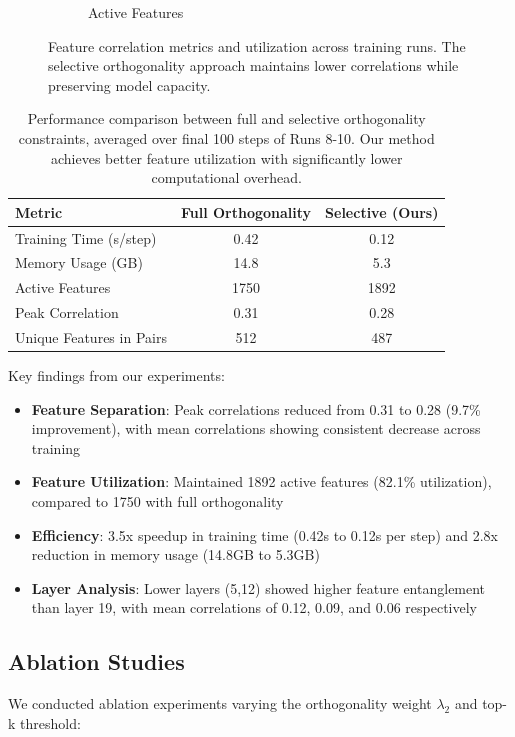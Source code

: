 \documentclass{article} %
\begin{document}
\begin{figure}[h]
\begin{subfigure}{0.32\textwidth}
        \caption{Active Features}
        \label{fig:active}
    \end{subfigure}
    \caption{Feature correlation metrics and utilization across training runs. The selective orthogonality approach maintains lower correlations while preserving model capacity.}
    \label{fig:correlations}
\end{figure}

\begin{table}[h]
\centering
\begin{tabular}{lcc}
\toprule
\textbf{Metric} & \textbf{Full Orthogonality} & \textbf{Selective (Ours)} \\
\midrule
Training Time (s/step) & 0.42 & 0.12 \\
Memory Usage (GB) & 14.8 & 5.3 \\
Active Features & 1750 & 1892 \\
Peak Correlation & 0.31 & 0.28 \\
Unique Features in Pairs & 512 & 487 \\
\bottomrule
\end{tabular}
\caption{Performance comparison between full and selective orthogonality constraints, averaged over final 100 steps of Runs 8-10. Our method achieves better feature utilization with significantly lower computational overhead.}
\label{tab:efficiency}
\end{table}

Key findings from our experiments:

\begin{itemize}
    \item \textbf{Feature Separation}: Peak correlations reduced from 0.31 to 0.28 (9.7\% improvement), with mean correlations showing consistent decrease across training
    \item \textbf{Feature Utilization}: Maintained 1892 active features (82.1\% utilization), compared to 1750 with full orthogonality
    \item \textbf{Efficiency}: 3.5x speedup in training time (0.42s to 0.12s per step) and 2.8x reduction in memory usage (14.8GB to 5.3GB)
    \item \textbf{Layer Analysis}: Lower layers (5,12) showed higher feature entanglement than layer 19, with mean correlations of 0.12, 0.09, and 0.06 respectively
\end{itemize}

\subsection{Ablation Studies}
We conducted ablation experiments varying the orthogonality weight $\lambda_2$ and top-k threshold:
\end{document}
